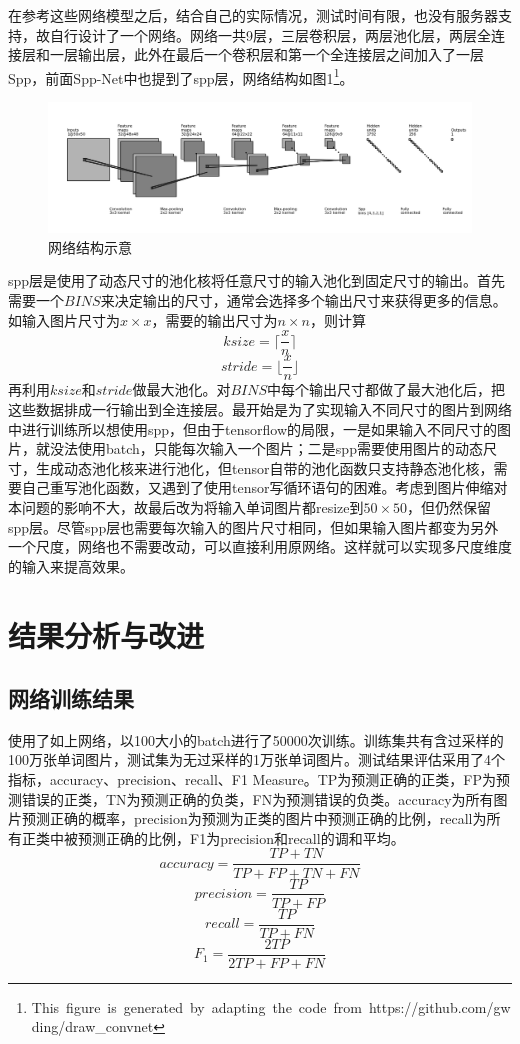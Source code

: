 \documentclass[12pt]{article}
\begin{document}
在参考这些网络模型之后，结合自己的实际情况，测试时间有限，也没有服务器支持，故自行设计了一个网络。网络一共9层，三层卷积层，两层池化层，两层全连接层和一层输出层，此外在最后一个卷积层和第一个全连接层之间加入了一层Spp，前面Spp-Net中也提到了spp层，网络结构如图1\footnote{\hbox{This figure is generated by adapting the code from https://github.com/gwding/draw\_convnet}}。
\begin{figure}[hp]
    \centering
    \includegraphics[scale=0.4]{mynet.png}
    \caption{网络结构示意}
    \label{fig:label}
\end{figure}
spp层是使用了动态尺寸的池化核将任意尺寸的输入池化到固定尺寸的输出。首先需要一个$BINS$来决定输出的尺寸，通常会选择多个输出尺寸来获得更多的信息。如输入图片尺寸为$x \times x$，需要的输出尺寸为$n \times n$，则计算
$$ksize = \lceil \frac x n \rceil$$
$$stride = \lfloor \frac x n \rfloor$$
再利用$ksize$和$stride$做最大池化。对$BINS$中每个输出尺寸都做了最大池化后，把这些数据排成一行输出到全连接层。\cite{spp}最开始是为了实现输入不同尺寸的图片到网络中进行训练所以想使用spp，但由于tensorflow的局限，一是如果输入不同尺寸的图片，就没法使用batch，只能每次输入一个图片；二是spp需要使用图片的动态尺寸，生成动态池化核来进行池化，但tensor自带的池化函数只支持静态池化核，需要自己重写池化函数，又遇到了使用tensor写循环语句的困难。考虑到图片伸缩对本问题的影响不大，故最后改为将输入单词图片都resize到$50 \times 50$，但仍然保留spp层。尽管spp层也需要每次输入的图片尺寸相同，但如果输入图片都变为另外一个尺度，网络也不需要改动，可以直接利用原网络。这样就可以实现多尺度维度的输入来提高效果。

\section{结果分析与改进}

\subsection{网络训练结果}
\noindent

使用了如上网络，以100大小的batch进行了50000次训练。训练集共有含过采样的100万张单词图片，测试集为无过采样的1万张单词图片。测试结果评估采用了4个指标，accuracy、precision、recall、F1 Measure。TP为预测正确的正类，FP为预测错误的正类，TN为预测正确的负类，FN为预测错误的负类。accuracy为所有图片预测正确的概率，precision为预测为正类的图片中预测正确的比例，recall为所有正类中被预测正确的比例，F1为precision和recall的调和平均。
\[accuracy = \frac {TP + TN} {TP + FP + TN + FN}\]
\[precision = \frac {TP} {TP + FP}\]
\[recall = \frac {TP} {TP + FN}\]
\[F_1 = \frac {2 TP } {2 TP + FP + FN}\]
\end{document}
